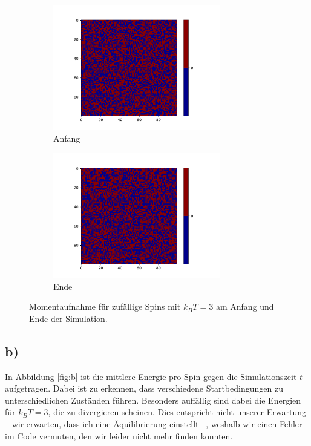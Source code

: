 \begin{figure}
  \begin{subfigure}{0.48\textwidth}
    \includegraphics[width = 0.8\textwidth]{A2/build/3kbt-a-zufall_anfang.pdf}
    \caption{Anfang}
  \end{subfigure}
  \begin{subfigure}{0.48\textwidth}
    \includegraphics[width = 0.8\textwidth]{A2/build/3kbt-a-zufall_ende.pdf}
    \caption{Ende}
  \end{subfigure}
  \caption{Momentaufnahme für zufällige Spins mit $k_B T = 3$ am Anfang und Ende der Simulation.}
  \label{fig:randomThree}
\end{figure}

\subsection*{b)}
In Abbildung \ref{fig:b} ist die mittlere Energie pro Spin gegen die Simulationszeit $t$ aufgetragen. Dabei ist zu erkennen, dass verschiedene Startbedingungen zu unterschiedlichen Zuständen führen. Besonders auffällig sind dabei die Energien für $k_B T = 3$, die zu divergieren scheinen. Dies entspricht nicht unserer Erwartung  – wir erwarten, dass ich eine Äquilibrierung einstellt –, weshalb wir einen Fehler im Code vermuten, den wir leider nicht mehr finden konnten. 

